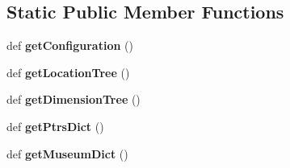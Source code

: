 \subsection*{Static Public Member Functions}
\begin{DoxyCompactItemize}
\item 
\mbox{\label{classshowmuseumtypes_1_1ShowMuseumTypes_ab40c940b7481123c45f7776febb0ea86}} 
def {\bfseries get\+Configuration} ()
\item 
\mbox{\label{classshowmuseumtypes_1_1ShowMuseumTypes_a339f067bd1e01b9d27c2962b7c31bbdd}} 
def {\bfseries get\+Location\+Tree} ()
\item 
\mbox{\label{classshowmuseumtypes_1_1ShowMuseumTypes_ad488e824706ffb23517fb5b8ecde33c8}} 
def {\bfseries get\+Dimension\+Tree} ()
\item 
\mbox{\label{classshowmuseumtypes_1_1ShowMuseumTypes_aed770fce93f9c64c9754d6d34a257efd}} 
def {\bfseries get\+Ptrs\+Dict} ()
\item 
\mbox{\label{classshowmuseumtypes_1_1ShowMuseumTypes_aafb486ee13d2bb904fd1aaee99713ccd}} 
def {\bfseries get\+Museum\+Dict} ()
\end{DoxyCompactItemize}
